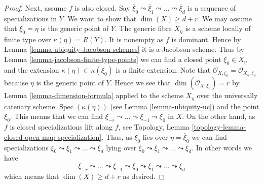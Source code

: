 \documentclass[10pt,a4paper]{amsart}
\theoremstyle{plain}
\theoremstyle{definition}
\theoremstyle{remark}
\numberwithin{equation}{subsection}
\def\Spec{\mathop{\mathrm{Spec}}}
\begin{document}
\begin{proof}
\medskip\noindent
Next, assume $f$ is also closed.
Say $\overline{\xi}_0 \leadsto \overline{\xi}_1 \leadsto \ldots
\leadsto \overline{\xi}_d$ is a sequence of specializations in $Y$.
We want to show that $\dim(X) \geq d + r$.
We may assume that $\overline{\xi}_0 = \eta$ is the generic point of $Y$.
The generic fibre $X_\eta$ is a scheme locally of finite type over
$\kappa(\eta) = R(Y)$. It is nonempty as $f$ is dominant. Hence by
Lemma \ref{lemma-ubiquity-Jacobson-schemes} it is a Jacobson scheme.
Thus by Lemma \ref{lemma-jacobson-finite-type-points}
we can find a closed point $\xi_0 \in X_\eta$ and the extension
$\kappa(\eta) \subset \kappa(\xi_0)$ is
a finite extension. Note that
$\mathcal{O}_{X, \xi_0} = \mathcal{O}_{X_\eta, \xi_0}$ because
$\eta$ is the generic point of $Y$. Hence we see that
$\dim(\mathcal{O}_{X, \xi_0}) = r$ by Lemma \ref{lemma-dimension-formula}
applied to the scheme $X_\eta$ over the universally catenary
scheme $\Spec(\kappa(\eta))$ (see Lemma \ref{lemma-ubiquity-uc})
and the point $\xi_0$. This means that we can find
$\xi_{-r} \leadsto \ldots \leadsto \xi_{-1} \leadsto \xi_0$
in $X$. On the other hand, as $f$ is closed specializations
lift along $f$, see
Topology, Lemma \ref{topology-lemma-closed-open-map-specialization}.
Thus, as $\xi_0$ lies
over $\eta = \overline{\xi}_0$ we can
find specializations $\xi_0 \leadsto \xi_1 \leadsto \ldots \leadsto \xi_d$
lying over $\overline{\xi}_0 \leadsto \overline{\xi}_1 \leadsto \ldots
\leadsto \overline{\xi}_d$. In other words we have
$$
\xi_{-r} \leadsto \ldots \leadsto \xi_{-1} \leadsto \xi_0
\leadsto \xi_1 \leadsto \ldots \leadsto \xi_d
$$
which means that $\dim(X) \geq d + r$ as desired.
\end{proof}
\end{document}
